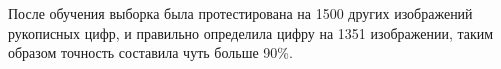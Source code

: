\documentclass{article}
\begin{document}
После обучения выборка была протестирована на 1500 других изображений рукописных цифр, и правильно определила цифру на 1351 изображении, таким образом точность составила чуть больше 90\%.














\end{document}
